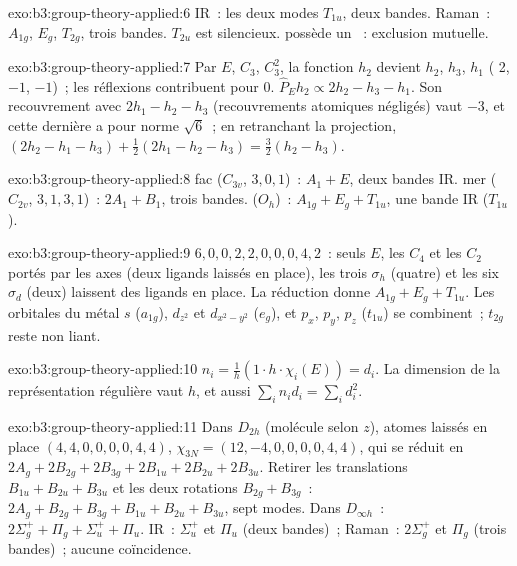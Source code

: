 \begin{solution}{exo:b3:group-theory-applied:6}
IR~: les deux modes $T_{1u}$, deux bandes. Raman~: $A_{1g}$, $E_g$,
$T_{2g}$, trois bandes.
$T_{2u}$ est silencieux.  possède un ~:
exclusion mutuelle.
\end{solution}

\begin{solution}{exo:b3:group-theory-applied:7}
Par $E$, $C_3$, $C_3^2$, la fonction $h_2$ devient $h_2$, $h_3$, $h_1$
( 2,
$-1$, $-1$)~; les réflexions contribuent pour 0. $\hat P_Eh_2 \propto 2h_2 - h_3 - h_1$.
Son recouvrement avec $2h_1 - h_2 - h_3$ (recouvrements atomiques
négligés) vaut $-3$, et cette dernière a pour norme $\sqrt6$~; en
retranchant la projection, $(2h_2 - h_1 - h_3) +
\frac12(2h_1 - h_2 - h_3) = \frac32(h_2 - h_3)$.
\end{solution}

\begin{solution}{exo:b3:group-theory-applied:8}
fac ($C_{3v}$,  $3, 0, 1$)~: $A_1 + E$, deux bandes IR. mer
($C_{2v}$,  $3, 1, 3, 1$)~: $2A_1 + B_1$, trois bandes.
 ($O_h$)~: $A_{1g} + E_g
+ T_{1u}$, une bande IR ($T_{1u}$).
\end{solution}

\begin{solution}{exo:b3:group-theory-applied:9}
 $6, 0, 0, 2, 2, 0, 0, 0, 4, 2$~: seuls $E$, les $C_4$ et les
$C_2$ portés par les axes (deux ligands laissés en place), les trois
$\sigma_h$ (quatre) et les six $\sigma_d$
(deux) laissent des ligands en place. La réduction donne
$A_{1g} + E_g + T_{1u}$. Les orbitales du métal $s$
($a_{1g}$), $d_{z^2}$ et $d_{x^2-y^2}$ ($e_g$), et $p_x$, $p_y$, $p_z$
($t_{1u}$) se combinent~;
$t_{2g}$ reste non liant.
\end{solution}

\begin{solution}{exo:b3:group-theory-applied:10}
$n_i = \frac1h(1\cdot h\cdot\chi_i(E)) = d_i$. La dimension de la
représentation régulière vaut $h$, et aussi $\sum_in_id_i = \sum_id_i^2$.
\end{solution}

\begin{solution}{exo:b3:group-theory-applied:11}
Dans $D_{2h}$ (molécule selon $z$), atomes laissés en place $(4, 4, 0, 0, 0, 0, 4, 4)$, $\chi_{3N}
= (12, -4, 0, 0, 0, 0, 4, 4)$, qui se réduit en $2A_g + 2B_{2g} + 2B_{3g} + 2B_{1u} + 2B_{2u}
+ 2B_{3u}$. Retirer les translations $B_{1u} + B_{2u} + B_{3u}$ et les
deux rotations
$B_{2g} + B_{3g}$~: $2A_g + B_{2g} + B_{3g} + B_{1u} + B_{2u} + B_{3u}$,
sept modes.
Dans $D_{\infty h}$~: $2\Sigma_g^+ + \Pi_g + \Sigma_u^+ + \Pi_u$. IR~:
$\Sigma_u^+$ et $\Pi_u$
(deux bandes)~; Raman~: $2\Sigma_g^+$ et $\Pi_g$ (trois bandes)~; aucune
coïncidence.
\end{solution}


